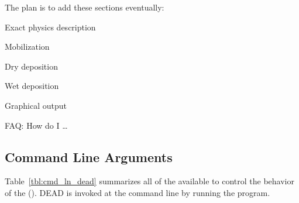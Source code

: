 \documentclass[12pt,twoside]{article}
\begin{document}
The plan is to add these sections eventually:
\begin{enumerate*}
\item Exact physics description
\begin{enumerate*}
\item Mobilization
\item Dry deposition
\item Wet deposition
\end{enumerate*}
\item Graphical output
\item FAQ: How do I \ldots
\end{enumerate*}

\subsection[Command Line Arguments]{Command Line Arguments}\label{sxn:cmd_ln}
Table~\ref{tbl:cmd_ln_dead} summarizes all of the 
 available to control the behavior of
the  ().
DEAD is invoked at the command line by running the  program. 
\end{document}
